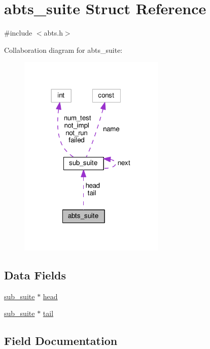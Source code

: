 \hypertarget{structabts__suite}{}\section{abts\+\_\+suite Struct Reference}
\label{structabts__suite}


{\ttfamily \#include $<$abts.\+h$>$}



Collaboration diagram for abts\+\_\+suite\+:
\nopagebreak
\begin{figure}[H]
\begin{center}
\leavevmode
\includegraphics[width=197pt]{structabts__suite__coll__graph}
\end{center}
\end{figure}
\subsection*{Data Fields}
\begin{DoxyCompactItemize}
\item 
\hyperlink{structsub__suite}{sub\+\_\+suite} $\ast$ \hyperlink{structabts__suite_aeecd85d4cd56321c38ff5fe14b9fcd97}{head}
\item 
\hyperlink{structsub__suite}{sub\+\_\+suite} $\ast$ \hyperlink{structabts__suite_a853a74cb297bbb7a8c3fc7b86c8e0551}{tail}
\end{DoxyCompactItemize}


\subsection{Field Documentation}
